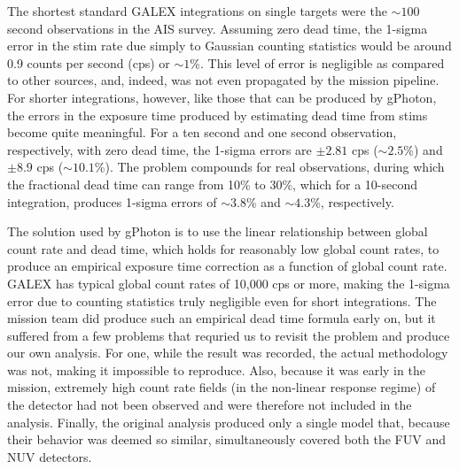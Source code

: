 \documentclass[5p]{elsarticle}
\begin{document}
The shortest standard GALEX integrations on single targets were the $\sim 100$ second observations in the AIS survey. Assuming zero dead time, the 1-sigma error in the stim rate due simply to Gaussian counting statistics would be around 0.9 counts per second (cps) or $\sim 1$\%. This level of error is negligible as compared to other sources, and, indeed, was not even propagated by the mission pipeline. For shorter integrations, however, like those that can be produced by gPhoton, the errors in the exposure time produced by estimating dead time from stims become quite meaningful. For a ten second and one second observation, respectively, with zero dead time, the 1-sigma errors are $\pm 2.81$ cps ($\sim 2.5$\%) and $\pm 8.9$ cps ($\sim 10.1$\%). The problem compounds for real observations, during which the fractional dead time can range from 10\% to 30\%, which for a 10-second integration, produces 1-sigma errors of $\sim 3.8$\% and $\sim 4.3$\%, respectively.

The solution used by gPhoton is to use the linear relationship between global count rate and dead time, which holds for reasonably low global count rates, to produce an empirical exposure time correction as a function of global count rate. GALEX has typical global count rates of 10,000 cps or more, making the 1-sigma error due to counting statistics truly negligible even for short integrations. The mission team did produce such an empirical dead time formula early on, but it suffered from a few problems that requried us to revisit the problem and produce our own analysis. For one, while the result was recorded, the actual methodology was not, making it impossible to reproduce. Also, because it was early in the mission, extremely high count rate fields (in the non-linear response regime) of the detector had not been observed and were therefore not included in the analysis. Finally, the original analysis produced only a single model that, because their behavior was deemed so similar, simultaneously covered both the FUV and NUV detectors.
\end{document}
